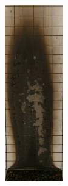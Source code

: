 \documentclass[twoside]{uocthesis}
\begin{document}
\begin{figure}[p]
	\includegraphics[width=1.0in]{../Figures/GBNG28_P5130434} \\


\end{figure}
\end{document}
